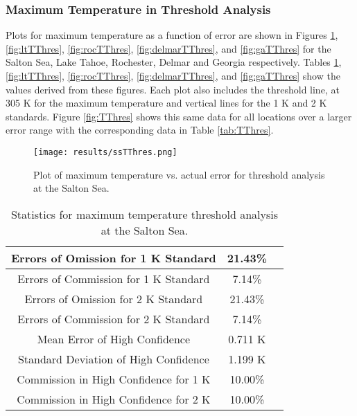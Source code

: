 \documentclass{book}
\begin{document}
\subsubsection{Maximum Temperature in Threshold Analysis}

Plots for maximum temperature as a function of error are shown in Figures \ref{fig:ssTThres}, \ref{fig:ltTThres}, \ref{fig:rocTThres}, \ref{fig:delmarTThres}, and \ref{fig:gaTThres} for the Salton Sea, Lake Tahoe, Rochester, Delmar and Georgia respectively.  Tables \ref{fig:ssTThres}, \ref{fig:ltTThres}, \ref{fig:rocTThres}, \ref{fig:delmarTThres}, and \ref{fig:gaTThres} show the values derived from these figures.  Each plot also includes the threshold line, at 305 K for the maximum temperature and vertical lines for the 1 K and 2 K standards.  Figure \ref{fig:TThres} shows this same data for all locations over a larger error range with the corresponding data in Table \ref{tab:TThres}.

\begin{minipage}[c]{0.47\textwidth}
\centering
\begin{figure}[H]
\texttt{[image: results/ssTThres.png]}
\caption{Plot of maximum temperature vs. actual error for threshold analysis at the Salton Sea.}
\label{fig:ssTThres}
\end{figure}
\end{minipage}
\begin{minipage}[c]{0.47\textwidth}
\begin{table}[H]
\centering
\footnotesize
\begin{tabular}{ | c | c | c | } \hline
Errors of Omission for 1 K Standard & 21.43\% \\ \hline
Errors of Commission for 1 K Standard & 7.14\% \\ \hline
Errors of Omission for 2 K Standard & 21.43\% \\ \hline
Errors of Commission for 2 K Standard & 7.14\% \\ \hline
Mean Error of High Confidence & 0.711 K \\ \hline
Standard Deviation of High Confidence & 1.199 K \\ \hline
Commission in High Confidence for 1 K & 10.00\% \\ \hline
Commission in High Confidence for 2 K & 10.00\% \\ \hline
\end{tabular}
\caption{Statistics for maximum temperature threshold analysis at the Salton Sea.}
\label{tab:ssTThres}
\end{table}
\end{minipage}
\end{document}
